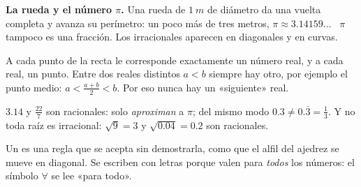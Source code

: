 \documentclass[11pt,a4paper]{article}
\newcommand{\per}[1]{\overline{#1}}
\let\nivelzuka\nivel
\renewcommand{\nivel}[2]{\Needspace{5\baselineskip}\nivelzuka{#1}{#2}}
\begin{document}
\textbf{La rueda y el número $\pi$.} Una rueda de $\SI{1}{m}$ de diámetro da una vuelta completa y avanza su perímetro:
un poco más de tres metros, $\pi\approx3.14159\ldots$ \ $\pi$ tampoco es una fracción. Los irracionales aparecen en
diagonales y en curvas.

\begin{figura}
\end{figura}

\begin{propiedad}
A cada punto de la recta le corresponde exactamente un número real, y a cada real, un punto. Entre dos reales
distintos $a<b$ siempre hay otro, por ejemplo el punto medio: $a<\tfrac{a+b}{2}<b$. Por eso nunca hay un «siguiente» real.
\end{propiedad}
\begin{ojo}
$3.14$ y $\tfrac{22}{7}$ son racionales: solo \emph{aproximan} a $\pi$; del mismo modo $0.3\neq0.\per3=\tfrac13$. Y no toda raíz es irracional: $\sqrt9=3$ y $\sqrt{0.04}=0.2$ son racionales.
\end{ojo}


Un  es una regla que se acepta sin demostrarla, como que el alfil del ajedrez se mueve en diagonal.
Se escriben con letras porque valen para \emph{todos} los números: el símbolo $\forall$ se lee «para todo».
\end{document}
